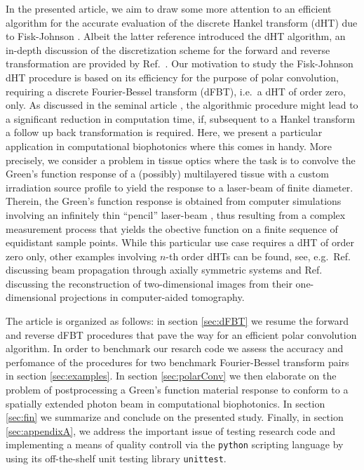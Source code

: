 \documentclass[12pt]{iopart}
\begin{document}
In the presented article, we aim to draw some more attention to an efficient 
algorithm for the accurate evaluation of the discrete Hankel transform (dHT) 
due to Fisk-Johnson \cite{FiskJohnson:1987}. Albeit the latter reference
introduced the dHT algorithm, an in-depth discussion of the discretization 
scheme for the forward and reverse transformation are provided by 
Ref.~\cite{Baddour:2015}.
Our motivation to study the Fisk-Johnson dHT procedure is based on its
efficiency for the purpose of polar convolution, requiring a discrete
Fourier-Bessel transform (dFBT), i.e.\ a dHT of order zero, only. As discussed
in the seminal article \cite{FiskJohnson:1987}, the algorithmic procedure might
lead to a significant reduction in computation time, if, subsequent to a Hankel
transform a follow up back transformation is required.  Here, we present a
particular application in computational biophotonics where this comes in handy. 
More precisely, we consider a problem in tissue optics where the task is to
convolve the Green's function response of a (possibly) multilayered tissue 
with a custom irradiation source profile to yield the response to a laser-beam 
of finite diameter.
Therein, the Green's function response is obtained from computer simulations 
involving an infinitely thin ``pencil'' laser-beam \cite{MCML:1995}, thus 
resulting from a complex measurement process that yields the obective 
function on a finite sequence of equidistant sample points.
While this particular use case requires a dHT of order zero only, other
examples involving $n$-th order dHTs can be found, see, e.g.\ Ref.\
\cite{GuizarSicairos:2004} discussing beam propagation through axially
symmetric systems and Ref.\ \cite{Higgins:1988} discussing the reconstruction 
of two-dimensional images from their one-dimensional projections in 
computer-aided tomography.


The article is organized as follows: in section \ref{sec:dFBT} we
resume the forward and reverse dFBT procedures that pave the way for an
efficient polar convolution algorithm. In order to benchmark our resarch code
we assess the accuracy and perfomance of the procedures for two benchmark
Fourier-Bessel transform pairs in section \ref{sec:examples}. In section
\ref{sec:polarConv} we then elaborate on the problem of postprocessing a
Green's function material response to conform to a spatially extended photon
beam in computational biophotonics.  In section \ref{sec:fin} we
summarize and conclude on the presented study.
Finally, in section \ref{sec:appendixA}, we address the important issue of
testing research code and implementing a means of quality controll via the
{\tt{python}} scripting language by using its off-the-shelf unit testing
library {\tt{unittest}}.
\end{document}

